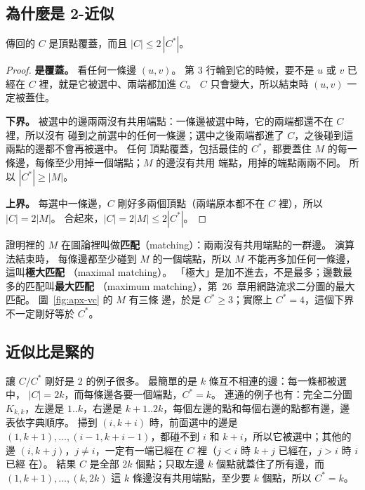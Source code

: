 \subsection{為什麼是 2-近似}

\begin{theorem}
\label{thm:apx-vc}
 傳回的 $C$ 是頂點覆蓋，而且 $|C| \le 2\,|C^*|$。
\end{theorem}

\begin{proof}
\textbf{是覆蓋。} 看任何一條邊 $(u, v)$。 第 3 行輪到它的時候，要不是 $u$ 或 $v$ 已經在 $C$
裡，就是它被選中、兩端都加進 $C$。 $C$ 只會變大，所以結束時 $(u, v)$ 一定被蓋住。

\textbf{下界。} 被選中的邊兩兩沒有共用端點：一條邊被選中時，它的兩端都還不在 $C$ 裡，所以沒有
碰到之前選中的任何一條邊；選中之後兩端都進了 $C$，之後碰到這兩點的邊都不會再被選中。 任何
頂點覆蓋，包括最佳的 $C^*$，都要蓋住 $M$ 的每一條邊，每條至少用掉一個端點；$M$ 的邊沒有共用
端點，用掉的端點兩兩不同。 所以 $|C^*| \ge |M|$。

\textbf{上界。} 每選中一條邊，$C$ 剛好多兩個頂點（兩端原本都不在 $C$ 裡），所以 $|C| = 2|M|$。
合起來，$|C| = 2|M| \le 2|C^*|$。
\end{proof}

證明裡的 $M$ 在圖論裡叫做\textbf{匹配}（matching）：兩兩沒有共用端點的一群邊。 演算法結束時，
每條邊都至少碰到 $M$ 的一個端點，所以 $M$ 不能再多加任何一條邊，這叫\textbf{極大匹配}
（maximal matching）。 「極大」是加不進去，不是最多；邊數最多的匹配叫\textbf{最大匹配}
（maximum matching），第~26~章用網路流求二分圖的最大匹配。 圖~\ref{fig:apx-vc} 的 $M$ 有三條
邊，於是 $C^* \ge 3$；實際上 $C^* = 4$，這個下界不一定剛好等於 $C^*$。

\subsection{近似比是緊的}

讓 $C / C^*$ 剛好是 $2$ 的例子很多。 最簡單的是 $k$ 條互不相連的邊：每一條都被選中，
$|C| = 2k$，而每條邊各要一個端點，$C^* = k$。 連通的例子也有：完全二分圖 $K_{k,k}$，左邊是
$1..k$，右邊是 $k+1..2k$，每個左邊的點和每個右邊的點都有邊，邊表依字典順序。 掃到 $(i, k+i)$
時，前面選中的邊是 $(1, k+1), \ldots, (i-1, k+i-1)$，都碰不到 $i$ 和 $k+i$，所以它被選中；其他的
邊 $(i, k+j)$，$j \ne i$，一定有一端已經在 $C$ 裡（$j < i$ 時 $k+j$ 已經在，$j > i$ 時 $i$ 已經
在）。 結果 $C$ 是全部 $2k$ 個點；只取左邊 $k$ 個點就蓋住了所有邊，而 $(1, k+1), \ldots,
(k, 2k)$ 這 $k$ 條邊沒有共用端點，至少要 $k$ 個點，所以 $C^* = k$。

